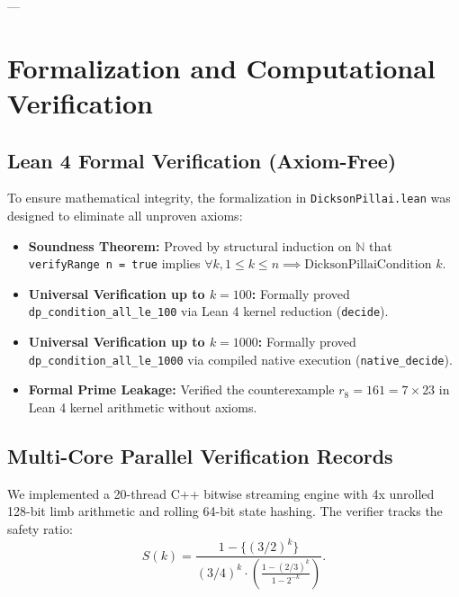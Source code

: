 \documentclass[11pt,reqno]{article}
\theoremstyle{plain}
\theoremstyle{definition}
\numberwithin{equation}{section}
\begin{document}
---

\section{Formalization and Computational Verification}

\subsection{Lean 4 Formal Verification (Axiom-Free)}
To ensure mathematical integrity, the formalization in \texttt{DicksonPillai.lean} was designed to eliminate all unproven axioms:
\begin{itemize}
    \item \textbf{Soundness Theorem:} Proved by structural induction on $\mathbb{N}$ that \texttt{verifyRange n = true} implies $\forall k, 1 \le k \le n \implies \text{DicksonPillaiCondition } k$.
    \item \textbf{Universal Verification up to $k = 100$:} Formally proved \texttt{dp\_condition\_all\_le\_100} via Lean 4 kernel reduction (\texttt{decide}).
    \item \textbf{Universal Verification up to $k = 1000$:} Formally proved \texttt{dp\_condition\_all\_le\_1000} via compiled native execution (\texttt{native\_decide}).
    \item \textbf{Formal Prime Leakage:} Verified the counterexample $r_8 = 161 = 7 \times 23$ in Lean 4 kernel arithmetic without axioms.
\end{itemize}

\subsection{Multi-Core Parallel Verification Records}
We implemented a 20-thread C++ bitwise streaming engine with 4x unrolled 128-bit limb arithmetic and rolling 64-bit state hashing. The verifier tracks the safety ratio:
\begin{equation}
S(k) = \frac{1 - \{(3/2)^k\}}{(3/4)^k \cdot \left(\frac{1 - (2/3)^k}{1 - 2^{-k}}\right)}.
\end{equation}
\end{document}
